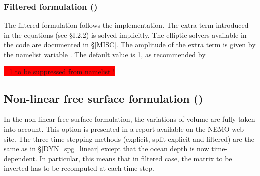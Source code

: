 \documentclass[NEMO_book]{subfiles}
\begin{document}
\subsubsection{Filtered formulation ()}
\label{DYN_spg_flt}

The filtered formulation follows the \citet{Roullet2000} implementation. The extra term introduced in the equations (see {\S}I.2.2) is solved implicitly. The elliptic solvers available in the code are 
documented in \S\ref{MISC}. The amplitude of the extra term is given by the namelist variable . The default value is 1, as recommended by \citet{Roullet2000}

\colorbox{red}{=1 to be suppressed from namelist !}

\subsection{Non-linear free surface formulation ()}
\label{DYN_spg_vvl}

In the non-linear free surface formulation, the variations of volume are fully taken into account. This option is presented in a report \citep{Levier2007} available on the NEMO web site. The three time-stepping methods (explicit, split-explicit and filtered) are the same as in \S\ref{DYN_spg_linear} except that the ocean depth is now time-dependent. In particular, this means that in filtered case, the matrix to be inverted has to be recomputed at each time-step.
\end{document}

